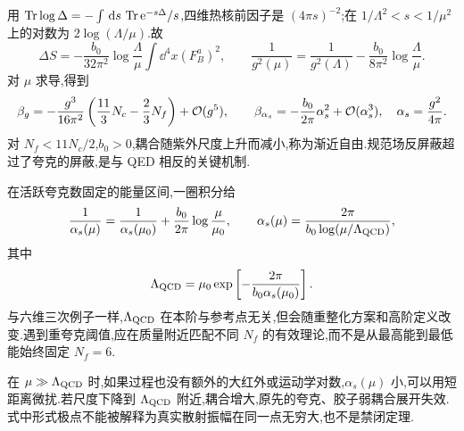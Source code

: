 用 $\operatorname{Tr}\log\Delta=-\int\,\mathrm d s\,\operatorname{Tr}\mathrm e^{-s\Delta}/s$,四维热核前因子是 $(4\pi s)^{-2}$;在 $1/\Lambda^2<s<1/\mu^2$ 上的对数为 $2\log(\Lambda/\mu)$.故
\begin{equation}
 \Delta S=-\frac{b_0}{32\pi^2}\log\frac\Lambda\mu
                \int\dd^4x(F_B^a)^2,
 \qquad
 \frac1{g^2(\mu)}=\frac1{g^2(\Lambda)}
                   -\frac{b_0}{8\pi^2}\log\frac\Lambda\mu.
\end{equation}
对 $\mu$ 求导,得到
\begin{equation}
 \beta_g=-\frac{g^3}{16\pi^2}
         \left(\frac{11}{3}N_c-\frac23N_f\right)+\mathcal O(g^5),
 \qquad
 \beta_{\alpha_s}=-\frac{b_0}{2\pi}\alpha_s^2+\mathcal O(\alpha_s^3),
 \quad\alpha_s=\frac{g^2}{4\pi}.
 \label{eq:qcd-beta-one-loop}
\end{equation}
对 $N_f<11N_c/2$,$b_0>0$,耦合随紫外尺度上升而减小,称为渐近自由.规范场反屏蔽超过了夸克的屏蔽,是与 QED 相反的关键机制.


在活跃夸克数固定的能量区间,一圈积分给
\begin{equation}
 \frac1{\alpha_s(\mu)}=\frac1{\alpha_s(\mu_0)}
                  +\frac{b_0}{2\pi}\log\frac\mu{\mu_0},\qquad
 \alpha_s(\mu)=\frac{2\pi}{b_0\log(\mu/\Lambda_{\rm QCD})},
 \label{eq:qcd-one-loop-running}
\end{equation}
其中
\begin{equation}
 \Lambda_{\rm QCD}=\mu_0
   \exp\left[-\frac{2\pi}{b_0\alpha_s(\mu_0)}\right].
\end{equation}
与六维三次例子一样,$\Lambda_{\rm QCD}$ 在本阶与参考点无关,但会随重整化方案和高阶定义改变.遇到重夸克阈值,应在质量附近匹配不同 $N_f$ 的有效理论,而不是从最高能到最低能始终固定 $N_f=6$.

\begin{center}
\end{center}

在 $\mu\gg\Lambda_{\rm QCD}$ 时,如果过程也没有额外的大红外或运动学对数,$\alpha_s(\mu)$ 小,可以用短距离微扰.若尺度下降到 $\Lambda_{\rm QCD}$ 附近,耦合增大,原先的夸克、胶子弱耦合展开失效.式中形式极点不能被解释为真实散射振幅在同一点无穷大,也不是禁闭定理.

